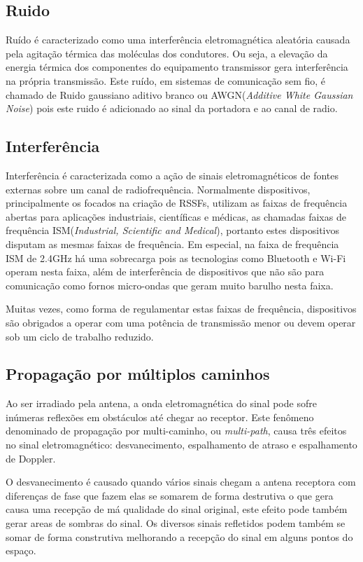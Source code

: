 \subsection*{Ruido}
Ruído é caracterizado como uma interferência eletromagnética aleatória causada pela agitação térmica das moléculas dos condutores. Ou seja, a elevação da energia térmica dos componentes do equipamento transmissor gera interferência na própria transmissão. Este ruído, em sistemas de comunicação sem fio, é chamado de Ruido gaussiano aditivo branco ou AWGN(\emph{Additive White Gaussian Noise}) pois este ruido é adicionado ao sinal da portadora e ao canal de radio.

\subsection*{Interferência}
Interferência é caracterizada como a ação de sinais eletromagnéticos de fontes externas sobre um canal de radiofrequência. Normalmente dispositivos, principalmente os focados na criação de RSSFs, utilizam as faixas de frequência abertas para aplicações industriais, científicas e médicas, as chamadas faixas de frequência ISM(\emph{Industrial, Scientific and Medical}), portanto estes dispositivos disputam as mesmas faixas de frequência. Em especial, na faixa de frequência ISM de 2.4GHz há uma sobrecarga pois as tecnologias como Bluetooth e Wi-Fi operam nesta faixa, além de interferência de dispositivos que não são para comunicação como fornos micro-ondas que geram muito barulho nesta faixa.

Muitas vezes, como forma de regulamentar estas faixas de frequência, dispositivos são obrigados a operar com uma potência de transmissão menor ou devem operar sob um ciclo de trabalho reduzido.

\subsection*{Propagação por múltiplos caminhos}
Ao ser irradiado pela antena, a onda eletromagnética do sinal pode sofre inúmeras reflexões em obstáculos até chegar ao receptor. Este fenômeno denominado de propagação por multi-caminho, ou \emph{multi-path}, causa três efeitos no sinal eletromagnético: desvanecimento, espalhamento de atraso e espalhamento de Doppler.

O desvanecimento é causado quando vários sinais chegam a antena receptora com diferenças de fase que fazem elas se somarem de forma destrutiva o que gera causa uma recepção de má qualidade do sinal original, este efeito pode também gerar areas de sombras do sinal. Os diversos sinais refletidos podem também se somar de forma construtiva melhorando a recepção do sinal em alguns pontos do espaço.

